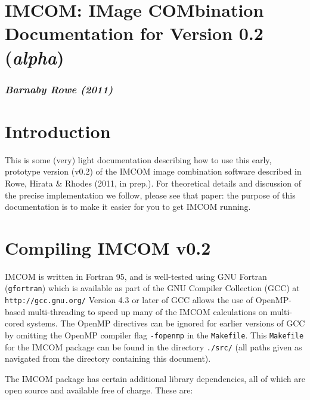 \documentclass[10pt]{article}
\begin{document}
\setlength{\parskip}{2.0ex plus 0.5ex minus 0.5ex}
\setlength{\parindent}{0cm} 

\section*{IMCOM: IMage COMbination \\ Documentation for Version 0.2 (\emph{alpha})}
\subsubsection*{\emph{Barnaby Rowe (2011)}}

\section{Introduction}
This is some (very) light documentation describing how to use this early, prototype version (v0.2) of the IMCOM image combination software described in Rowe, Hirata \& Rhodes (2011, in prep.).  For theoretical details and discussion of the precise implementation we follow, please see that paper: the purpose of this documentation is to make it easier for you to get IMCOM running.

\section{Compiling IMCOM v0.2}
IMCOM is written in Fortran 95, and is well-tested using GNU Fortran (\texttt{gfortran}) which is available as part of the GNU Compiler Collection (GCC) at \newline
\texttt{http://gcc.gnu.org/} \newline
Version 4.3 or later of GCC allows the use of OpenMP-based multi-threading to speed up many of the IMCOM calculations on multi-cored systems.  The OpenMP directives can be ignored for earlier versions of GCC by omitting the OpenMP compiler flag \texttt{-fopenmp} in the \texttt{Makefile}.  This \texttt{Makefile} for the IMCOM package can be found in the directory \texttt{./src/} (all paths given as navigated from the directory containing this document).

The IMCOM package has certain additional library dependencies, all of which are open source and available free of charge.  These are:
\end{document}
